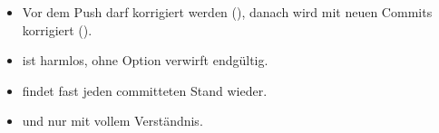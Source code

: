 \begin{zusammenfassung}
\begin{itemize}[nosep]
  \item Vor dem Push darf korrigiert werden (), danach wird mit neuen Commits korrigiert ().
  \item {} ist harmlos,  ohne Option verwirft endgültig.
  \item {} findet fast jeden committeten Stand wieder.
  \item {} und  nur mit vollem Verständnis.
\end{itemize}
\end{zusammenfassung}
